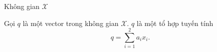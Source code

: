 \begin{frame}{Không gian \(\mathcal{X}\)}
    \begin{center}
        \begin{minipage}{0.4\linewidth}
            \begin{center}
                \resizebox{1\linewidth}{!}{}
            \end{center}
        \end{minipage}
        \hspace{1mm}
        \begin{minipage}{0.4\linewidth}
            Gọi \(q\) là một vector trong không gian \(\mathcal{X}\). \(q\) là một tổ hợp tuyến tính 
            \begin{equation}
                q = \sum_{i=1}^{2} a_i x_i.
                \label{eq:3.2}
            \end{equation}
        \end{minipage}
    \end{center}
\end{frame}